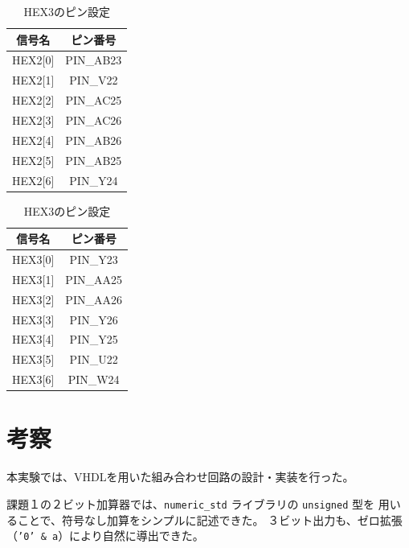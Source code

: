 \documentclass[12pt,a4paper]{ltjsarticle}
\begin{document}
\begin{table}[H]
  \begin{minipage}[t]{0.48\linewidth}
    \centering
    \caption{HEX2のピン設定}
    \label{tab:pin-hex2}
    \begin{tabular}{cc}
      \toprule
      信号名 & ピン番号 \\
      \midrule
      HEX2{[0]} & PIN\_AB23 \\
      HEX2{[1]} & PIN\_V22  \\
      HEX2{[2]} & PIN\_AC25 \\
      HEX2{[3]} & PIN\_AC26 \\
      HEX2{[4]} & PIN\_AB26 \\
      HEX2{[5]} & PIN\_AB25 \\
      HEX2{[6]} & PIN\_Y24  \\
      \bottomrule
    \end{tabular}
  \end{minipage}
  \hfill
  \begin{minipage}[t]{0.48\linewidth}
    \centering
    \caption{HEX3のピン設定}
    \label{tab:pin-hex3}
    \begin{tabular}{cc}
      \toprule
      信号名 & ピン番号 \\
      \midrule
      HEX3{[0]} & PIN\_Y23  \\
      HEX3{[1]} & PIN\_AA25 \\
      HEX3{[2]} & PIN\_AA26 \\
      HEX3{[3]} & PIN\_Y26  \\
      HEX3{[4]} & PIN\_Y25  \\
      HEX3{[5]} & PIN\_U22  \\
      HEX3{[6]} & PIN\_W24  \\
      \bottomrule
    \end{tabular}
  \end{minipage}
\end{table}

\section{考察}

本実験では、VHDLを用いた組み合わせ回路の設計・実装を行った。

課題１の２ビット加算器では、\texttt{numeric\_std} ライブラリの \texttt{unsigned} 型を
用いることで、符号なし加算をシンプルに記述できた。
３ビット出力も、ゼロ拡張（\texttt{'0' \& a}）により自然に導出できた。
\end{document}
